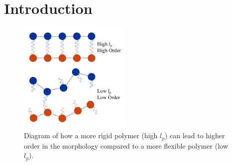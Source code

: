 \section{Introduction}
\begin{figure}
    \begin{center}
        \includegraphics[width=0.48\textwidth]{src/figures/pers_l_figs/persistence_length.png}
    \end{center}    
  \caption{Diagram of how a more rigid polymer (high $l_p$) can lead to higher order in the morphology compared to a more flexible polymer (low $l_p$).}
  \label{pers_length}
\end{figure}
